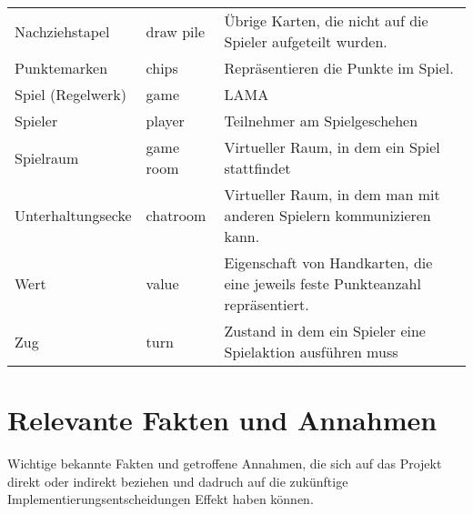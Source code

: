 \begin{center}
\begin{longtable}{p{} p{} p{}}
 			Nachziehstapel & draw pile & Übrige Karten, die nicht auf die Spieler aufgeteilt wurden.\\
 			Punktemarken & chips & Repräsentieren die Punkte im Spiel.\\
			Spiel (Regelwerk) & game & LAMA \\
			Spieler & player & Teilnehmer am Spielgeschehen\\
			Spielraum & game room & Virtueller Raum, in dem ein Spiel stattfindet\\
			Unterhaltungsecke & chatroom & Virtueller Raum, in dem man mit anderen Spielern kommunizieren kann.\\
			Wert & value & Eigenschaft von Handkarten, die eine jeweils feste Punkteanzahl repräsentiert.\\
			Zug & turn & Zustand in dem ein Spieler eine Spielaktion ausführen muss\\
		\end{longtable}
\end{center}

\section{Relevante Fakten und Annahmen}

Wichtige bekannte Fakten und getroffene Annahmen, die sich auf das Projekt direkt oder indirekt beziehen und dadruch auf die zukünftige Implementierungsentscheidungen Effekt haben können.

\setcounter{fa}{10}

